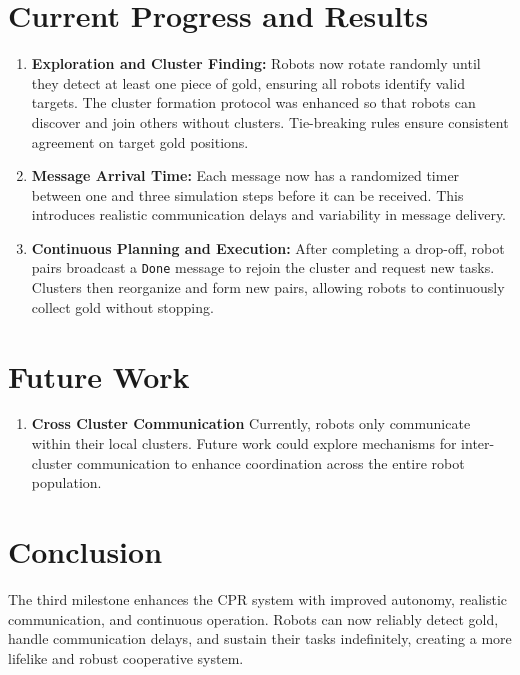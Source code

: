\documentclass[12pt,a4paper]{article}
\begin{document}
\section{Current Progress and Results}
\begin{enumerate}
    \item \textbf{Exploration and Cluster Finding:}  
    Robots now rotate randomly until they detect at least one piece of gold, ensuring all robots identify valid targets. The cluster formation protocol was enhanced so that robots can discover and join others without clusters. Tie-breaking rules ensure consistent agreement on target gold positions.
    
    \item \textbf{Message Arrival Time:}  
    Each message now has a randomized timer between one and three simulation steps before it can be received. This introduces realistic communication delays and variability in message delivery.
    
    \item \textbf{Continuous Planning and Execution:}  
    After completing a drop-off, robot pairs broadcast a \texttt{Done} message to rejoin the cluster and request new tasks. Clusters then reorganize and form new pairs, allowing robots to continuously collect gold without stopping.
\end{enumerate}

\section{Future Work}
\begin{enumerate}
    \item \textbf{Cross Cluster Communication} Currently, robots only communicate within their local clusters. Future work could explore mechanisms for inter-cluster communication to enhance coordination across the entire robot population.
\end{enumerate}

\section{Conclusion}
The third milestone enhances the CPR system with improved autonomy, realistic communication, and continuous operation. Robots can now reliably detect gold, handle communication delays, and sustain their tasks indefinitely, creating a more lifelike and robust cooperative system.
\end{document}
